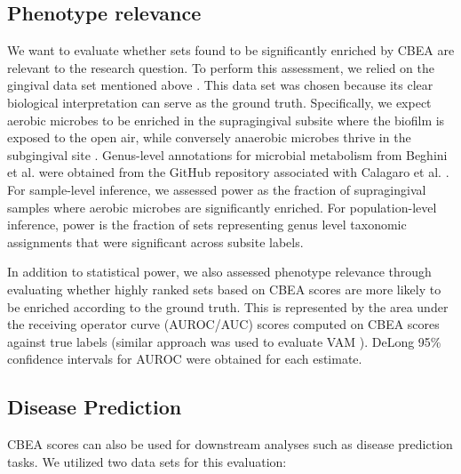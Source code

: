 \documentclass[10pt,letterpaper]{article}
\begin{document}
\subsection*{Phenotype relevance}
We want to evaluate whether sets found to be significantly enriched by CBEA are relevant to the research question. To perform this assessment, we relied on the gingival data set mentioned above \cite{consortium2012, proctor2019}. This data set was chosen because its clear biological interpretation can serve as the ground truth. Specifically, we expect aerobic microbes to be enriched in the supragingival subsite where the biofilm is exposed to the open air, while conversely anaerobic microbes thrive in the subgingival site \cite{thurnheer2016}. Genus-level annotations for microbial metabolism from Beghini et al. \cite{beghini2019} were obtained from the GitHub repository associated with Calagaro et al. \cite{matteocalgaro2020}. For sample-level inference, we assessed power as the fraction of supragingival samples where aerobic microbes are significantly enriched. For population-level inference, power is the fraction of sets representing genus level taxonomic assignments that were significant across subsite labels.  

In addition to statistical power, we also assessed phenotype relevance through evaluating whether highly ranked sets based on CBEA scores are more likely to be enriched according to the ground truth. This is represented by the area under the receiving operator curve (AUROC/AUC) scores computed on CBEA scores against true labels (similar approach was used to evaluate VAM \cite{frost2020}). DeLong 95\% confidence intervals for AUROC \cite{delong1988} were obtained for each estimate. 

\subsection*{Disease Prediction}
CBEA scores can also be used for downstream analyses such as disease prediction tasks. We utilized two data sets for this evaluation: 
\end{document}
